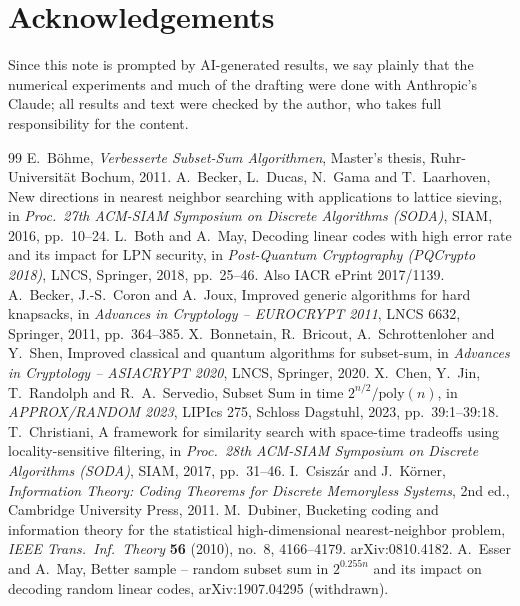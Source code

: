 \documentclass[11pt]{article}
\theoremstyle{definition}
\theoremstyle{remark}
\begin{document}
\section*{Acknowledgements}
Since this note is prompted by AI-generated results, we say plainly that the numerical experiments and much of the
drafting were done with Anthropic's Claude; all results and text were checked by the author, who takes full
responsibility for the content.

\begin{thebibliography}{99}
 E.~B\"ohme, \emph{Verbesserte Subset-Sum Algorithmen}, Master's thesis, Ruhr-Universit\"at Bochum,
2011.
 A.~Becker, L.~Ducas, N.~Gama and T.~Laarhoven, New directions in nearest neighbor searching with
applications to lattice sieving, in \emph{Proc.\ 27th ACM-SIAM Symposium on Discrete Algorithms (SODA)}, SIAM, 2016,
pp.~10--24.
 L.~Both and A.~May, Decoding linear codes with high error rate and its impact for LPN security,
in \emph{Post-Quantum Cryptography (PQCrypto 2018)}, LNCS, Springer, 2018, pp.~25--46. Also IACR ePrint 2017/1139.
 A.~Becker, J.-S.~Coron and A.~Joux, Improved generic algorithms for hard knapsacks, in
\emph{Advances in Cryptology -- EUROCRYPT 2011}, LNCS 6632, Springer, 2011, pp.~364--385.
 X.~Bonnetain, R.~Bricout, A.~Schrottenloher and Y.~Shen, Improved classical and quantum algorithms
for subset-sum, in \emph{Advances in Cryptology -- ASIACRYPT 2020}, LNCS, Springer, 2020.
 X.~Chen, Y.~Jin, T.~Randolph and R.~A.~Servedio, Subset Sum in time $2^{n/2}/\mathrm{poly}(n)$, in
\emph{APPROX/RANDOM 2023}, LIPIcs 275, Schloss Dagstuhl, 2023, pp.~39:1--39:18.
 T.~Christiani, A framework for similarity search with space-time tradeoffs using locality-sensitive
filtering, in \emph{Proc.\ 28th ACM-SIAM Symposium on Discrete Algorithms (SODA)}, SIAM, 2017, pp.~31--46.
 I.~Csisz\'ar and J.~K\"orner, \emph{Information Theory: Coding Theorems for Discrete Memoryless
Systems}, 2nd ed., Cambridge University Press, 2011.
 M.~Dubiner, Bucketing coding and information theory for the statistical high-dimensional
nearest-neighbor problem, \emph{IEEE Trans.\ Inf.\ Theory} \textbf{56} (2010), no.~8, 4166--4179. arXiv:0810.4182.
 A.~Esser and A.~May, Better sample -- random subset sum in $2^{0.255n}$ and its impact on decoding
random linear codes, arXiv:1907.04295 (withdrawn).

\end{thebibliography}
\end{document}

